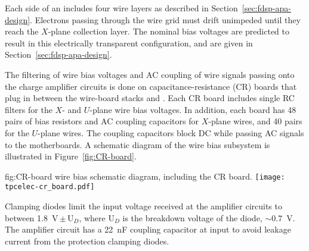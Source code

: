 Each side of an  includes four wire layers as described in Section~\ref{sec:fdsp-apa-design}. 
Electrons passing through the wire grid must drift unimpeded until they reach the $X$-plane 
collection layer. The nominal bias voltages are predicted to result in this electrically 
transparent configuration, and are given in Section~\ref{sec:fdsp-apa-design}. 

The filtering of wire bias voltages and AC coupling of wire signals passing
onto the charge amplifier circuits is done on capacitance-resistance (CR) boards that plug in between the  wire-board stacks and .
Each CR board includes single RC filters for the $X$- and $U$-plane wire bias voltages. In addition, each board has \num{48} 
pairs of bias resistors and AC coupling capacitors for $X$-plane wires, and \num{40} pairs for the $U$-plane wires. The coupling capacitors block DC while passing AC 
signals to the  motherboards.  A schematic diagram of the   wire bias subsystem is illustrated in Figure~\ref{fig:CR-board}.

\begin{dunefigure}
{fig:CR-board}
{  wire bias schematic diagram, including the CR board.}
\texttt{[image: tpcelec-cr\_board.pdf]}
\end{dunefigure}


Clamping diodes limit the input voltage received at the amplifier circuits to between \SI{1.8}{V}\,$\pm$\,U$_D$, where U$_D$
is the breakdown voltage of the diode, $\sim$\SI{0.7}{V}.
The amplifier circuit has a \SI{22}{nF} coupling capacitor at input to avoid leakage current from the protection clamping diodes. 

